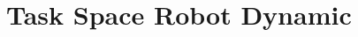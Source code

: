 \documentclass[main.tex]{subfiles}
\begin{document}
\section{Task Space Robot Dynamic}\label{sec:Robot_Dyn}
\end{document}
